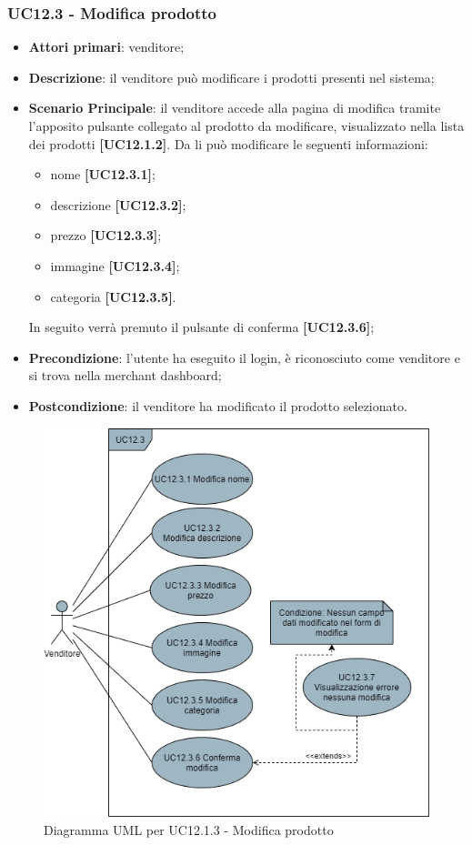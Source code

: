 \subsubsection{UC12.3 - Modifica prodotto}
\begin{itemize}
\item \textbf{Attori primari}: venditore;
\item \textbf{Descrizione}: il venditore può modificare i prodotti presenti nel sistema;
\item \textbf{Scenario Principale}: il venditore accede alla pagina di modifica tramite l'apposito pulsante collegato al prodotto da modificare, visualizzato nella lista dei prodotti \textbf{[UC12.1.2]}. Da li può modificare le seguenti informazioni:
\begin{itemize}
	\item nome \textbf{[UC12.3.1]};
	\item descrizione \textbf{[UC12.3.2]};
	\item prezzo \textbf{[UC12.3.3]};
	\item immagine \textbf{[UC12.3.4]};
	\item categoria \textbf{[UC12.3.5]}.
\end{itemize}
In seguito verrà premuto il pulsante di conferma \textbf{[UC12.3.6]};
\item \textbf{Precondizione}: l'utente ha eseguito il login, è riconosciuto come venditore e si trova nella merchant dashboard;
\item \textbf{Postcondizione}: il venditore ha modificato il prodotto selezionato.
\end{itemize}

\begin{figure}[H]
\centering
\includegraphics[scale=0.6]{res/UseCase/Immagini/ModificaProdotto}
\caption{Diagramma UML per UC12.1.3 - Modifica prodotto}
\end{figure}

